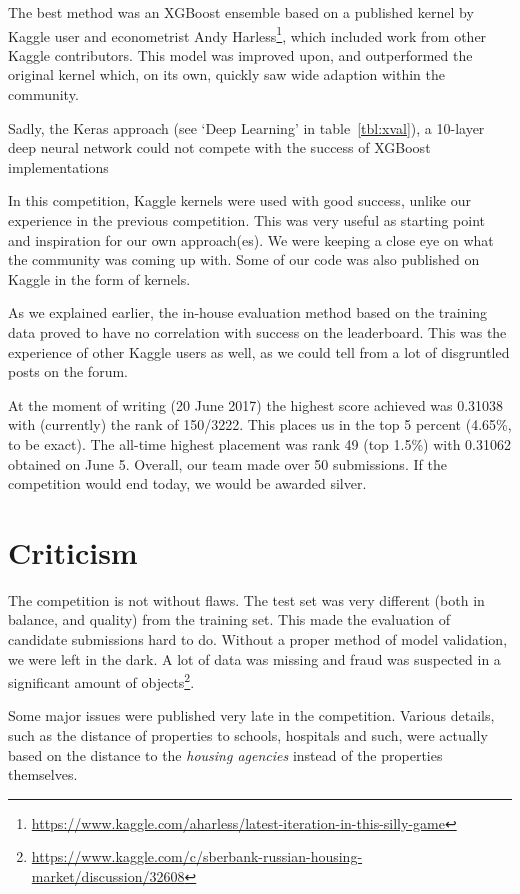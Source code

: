 \documentclass[a4paper,11pt,twocolumn]{article}
\begin{document}
The best method was an XGBoost ensemble based on a published kernel by Kaggle
user and econometrist Andy
Harless\footnote{\url{https://www.kaggle.com/aharless/latest-iteration-in-this-silly-game}},
which included work from other Kaggle contributors. This model was improved
upon, and outperformed the original kernel which, on its own, quickly saw wide
adaption within the community.

Sadly, the Keras approach (see `Deep Learning' in table~\ref{tbl:xval}), a
10-layer deep neural network could not compete with the success of XGBoost
implementations

In this competition, Kaggle kernels were used with good success, unlike our
experience in the previous competition. This was very useful as starting point
and inspiration for our own approach(es). We were keeping a close eye on what
the community was coming up with. Some of our code was also published on Kaggle
in the form of kernels.

As we explained earlier, the in-house evaluation method based on the training
data proved to have no correlation with success on the leaderboard. This was the
experience of other Kaggle users as well, as we could tell from a lot of
disgruntled posts on the forum.

At the moment of writing (20 June 2017) the highest score achieved was 0.31038
with (currently) the rank of 150/3222. This places us in the top 5 percent
(4.65\%, to be exact). The all-time highest placement was rank 49 (top 1.5\%)
with 0.31062 obtained on June 5. Overall, our team made over 50 submissions. If
the competition would end today, we would be awarded silver.

\section{Criticism}
The competition is not without flaws. The test set was very different (both in
balance, and quality) from the training set. This made the evaluation of
candidate submissions hard to do. Without a proper method of model validation,
we were left in the dark. A lot of data was missing and fraud was suspected in a
significant amount of
objects\footnote{\url{https://www.kaggle.com/c/sberbank-russian-housing-market/discussion/32608}}.

Some major issues were published very late in the competition. Various
details, such as the distance of properties to schools, hospitals and such, were
actually based on the distance to the \emph{housing agencies} instead of the
properties themselves.
\end{document}
